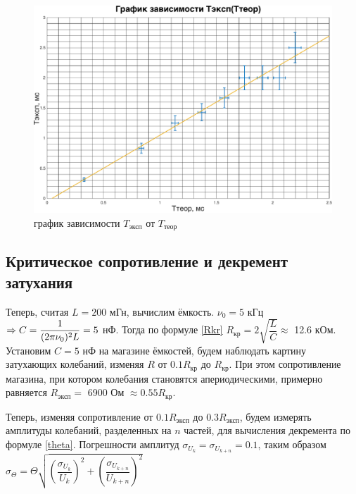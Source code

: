 \documentclass[a4paper,14pt]{article}
\begin{document}
\begin{center}
\begin{figure}[hbt!]
	\centering
	\includegraphics[width=\linewidth]{gr1.pdf}
	\caption{график зависимости $T_{\text{эксп}}$ от $T_{\text{теор}}$}
	\label{gr1}
\end{figure}
\end{center}

\subsection*{Критическое сопротивление и декремент затухания}

Теперь, считая $L = 200 $ мГн, вычислим  ёмкость. $\nu_0 = 5$ кГц $\Rightarrow C = \dfrac{1}{(2\pi \nu_0)^2 L} = 5$ нФ. Тогда по формуле \eqref{Rkr}
$R_{\text{кр}} = 2 \sqrt{\dfrac{L}{C}} \approx$ 12.6 кОм.
Установим $C = 5$ нФ на магазине ёмкостей, будем наблюдать картину затухающих колебаний, изменяя $R$ от $0.1 R_{\text{кр}}$ до $ R_{\text{кр}} $. При этом сопротивление магазина, при котором колебания становятся апериодическими, примерно равняется $R_\text{эксп} =$ 6900 Ом $\approx 0.55 R_\text{кр}$.

Теперь, изменяя сопротивление от $0.1 R_\text{эксп} $ до $ 0.3 R_\text{эксп} $, будем измерять амплитуды колебаний, разделенных на $ n $ частей, для вычисления декремента по формуле \eqref{theta}. Погрешности амплитуд $  \sigma_{U_k} = \sigma_{U_{k+n}} = 0.1 $, таким образом 
$\sigma_{\Theta} = \Theta \sqrt{ \left( \dfrac{ \sigma_{U_k}}{U_k} \right)^2 + \left( \dfrac{ \sigma_{U_{k+n}} }{U_{k+n}} \right)^2 }$
\end{document}

